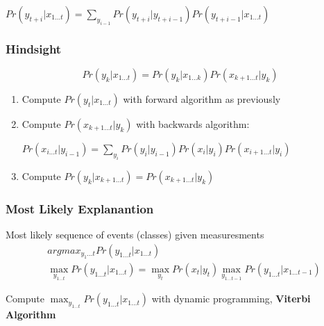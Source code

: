\documentclass[]{article}
\theoremstyle{definition}
\begin{document}
\begin{algorithmic}
    \State $Pr(y_{t+i} | x_{1 \ldots t}) = \sum_{y_{i-1}} Pr(y_{t+i} | y_{t+i-1}) Pr(y_{t+i-1} | x_{1 \ldots t})$
    \EndFor
\end{algorithmic}

\subsubsection{Hindsight}
\label{ssub:Hindsight}

\begin{equation*}
    Pr(y_k | x_{1 \ldots t}) = Pr(y_k | x_{1 \ldots k}) Pr(x_{k+1 \ldots t} | y_k)
\end{equation*}

\begin{enumerate}
    \item Compute $Pr(y_t | x_{1 \ldots t})$ with forward algorithm as previously
    \item Compute $Pr(x_{k+1 \ldots t} | y_k)$ with backwards algorithm:

        \begin{algorithmic}
            \State $Pr(x_{i \ldots t} | y_{i-1}) = \sum_{y_{i}} Pr(y_{i} | y_{i-1}) Pr(x_i | y_i) Pr(x_{i+1 \ldots t} | y_i)$
            \EndFor
        \end{algorithmic}

    \item Compute $Pr(y_k | x_{k+1 \ldots t}) = Pr(x_{k+1 \ldots t} | y_k)$
\end{enumerate}

\subsubsection{Most Likely Explanantion}
\label{ssub:Most Likely Explanantion}

Most likely sequence of events (classes) given measuresments
\begin{align*}
    & argmax_{y_1 \ldots t} Pr(y_{1 \ldots t} | x_{1 \ldots t}) \\
    & \max_{y_{1 \ldots t}} Pr(y_{1 \ldots t} | x_{1 \ldots t}) = \max_{y_t} Pr(x_t | y_t) \max_{y_{1 \ldots t-1}} Pr(y_{1 \ldots t} | x_{1 \ldots t-1})
\end{align*}

Compute $\max_{y_{1 \ldots t}} Pr(y_{1 \ldots t}| x_{1 \ldots t})$ with dynamic programming, \textbf{Viterbi Algorithm}
\end{document}
